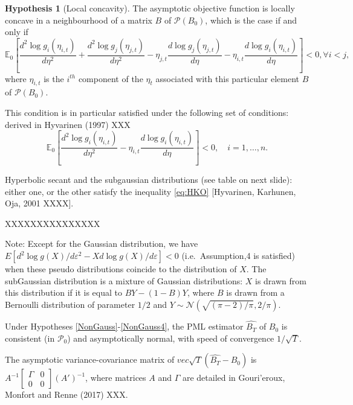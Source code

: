 \documentclass[
]{book}
\theoremstyle{definition}
\theoremstyle{definition}
\theoremstyle{definition}
\theoremstyle{definition}
\newtheorem{hypothesis}{Hypothesis}[chapter]
\theoremstyle{remark}
\begin{document}
\begin{hypothesis}[Local concavity]
\protect\hypertarget{hyp:NonGauss4}{}\label{hyp:NonGauss4}The asymptotic objective function is locally concave in a neighbourhood of a matrix \(B\) of \(\mathcal{P}(B_0)\), which is the case if and only if
\[
\mathbb{E}_0 \left[ \frac{d^2 \log g_i (\eta_{i,t})}{d\eta^2} + \frac{d^2 \log g_j (\eta_{j,t})}{d\eta^2} - \eta_{j,t} \frac{d\log g_j (\eta_{j,t})}{d\eta}- \eta_{i,t} \frac{d\log g_i (\eta_{i,t})}{d\eta} \right] < 0, \forall i<j,
\]
where \(\eta_{i,t}\) is the \(i^{th}\) component of the \(\eta_t\) associated with this particular element \(B\) of \(\mathcal{P}(B_0)\).
\end{hypothesis}

This condition is in particular satisfied under the following set of conditions: derived in Hyvarinen (1997) XXX
\begin{equation}
\mathbb{E}_0 \left[\frac{d^2 \log g_i(\eta_{i,t})}{d\eta^2} - \eta_{i,t} \frac{d\log g_i(\eta_{i,t})}{d\eta}\right] <0,\quad  i=1,\ldots, n. \label{eq:HKO}
\end{equation}

Hyperbolic secant and the subgaussian distributions (see table on next slide): either one, or the other satisfy the inequality \eqref{eq:HKO} {[}Hyvarinen, Karhunen, Oja, 2001 XXXX{]}.

XXXXXXXXXXXXXXX

Note: Except for the Gaussian distribution, we have \(E[d^2 \log g(X)/d \varepsilon^2 - X d\log g(X)/d \varepsilon] < 0\) (i.e.~Assumption,4 is satisfied) when these pseudo distributions coincide to the distribution of \(X\). The subGaussian distribution is a mixture of Gaussian distributions: \(X\) is drawn from this distribution if it is equal to \(BY - (1-B)Y\), where \(B\) is drawn from a Bernoulli distribution of parameter \(1/2\) and \(Y \sim \mathcal{N}(\sqrt{(\pi-2)/\pi},2/\pi)\).

Under Hypotheses \ref{NonGauss}-\ref{NonGauss4}, the PML estimator \(\widehat{B_T}\) of \(B_0\) is consistent (in \(\mathcal{P}_0\)) and asymptotically normal, with speed of convergence \(1/\sqrt{T}\).

The asymptotic variance-covariance matrix of \(vec \sqrt{T} (\widehat{B_T} - B_0)\) is \(A^{-1} \left[\begin{array}{cc} \Gamma & 0 \\ 0 & 0 \end{array} \right] (A')^{-1}\), where matrices \(A\) and \(\Gamma\) are detailed in Gouri'eroux, Monfort and Renne (2017) XXX.
\end{document}
